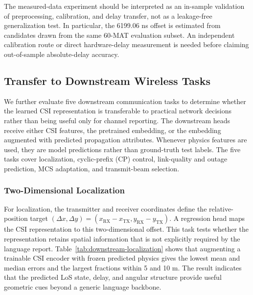 The measured-data experiment should be interpreted as an in-sample validation of preprocessing,
calibration, and delay transfer, not as a leakage-free generalization test. In particular, the
6199.06 ns offset is estimated from candidates drawn from the same 60-MAT evaluation subset.
An independent calibration route or direct hardware-delay measurement is needed before claiming
out-of-sample absolute-delay accuracy.

\subsection{Transfer to Downstream Wireless Tasks}

We further evaluate five downstream communication tasks to determine whether the learned CSI
representation is transferable to practical network decisions rather than being useful only for
channel reporting. The downstream heads receive either CSI features, the pretrained embedding, or the
embedding augmented with predicted propagation attributes. Whenever physics features are used, they are
model predictions rather than ground-truth test labels. The five tasks cover localization,
cyclic-prefix (CP) control, link-quality and outage prediction, MCS adaptation, and transmit-beam
selection.

\subsubsection{Two-Dimensional Localization}

For localization, the transmitter and receiver coordinates define the relative-position target
\((\Delta x,\Delta y)=(x_{\mathrm{RX}}-x_{\mathrm{TX}},
y_{\mathrm{RX}}-y_{\mathrm{TX}})\). A regression head maps the CSI representation to this two-dimensional
offset. This task tests whether the representation retains spatial information that is not explicitly
required by the language report. Table~\ref{tab:downstream-localization} shows that augmenting a
trainable CSI encoder with frozen predicted physics gives the lowest mean and median errors and the
largest fractions within 5 and 10 m. The result indicates that the predicted LoS state, delay, and
angular structure provide useful geometric cues beyond a generic language backbone.

